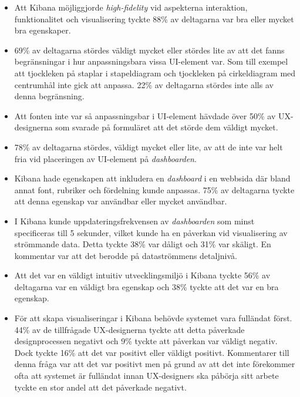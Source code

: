 \documentclass[12pt]{kththesis}
\begin{document}
\begin{itemize}
\item Att Kibana möjliggjorde \textit{high-fidelity} vid aspekterna interaktion, funktionalitet och visualisering tyckte 88\% av deltagarna var bra eller mycket bra egenskaper.

\item 69\% av deltagarna stördes väldigt mycket eller stördes lite av att det fanns begränsningar i hur anpassningsbara vissa UI-element var. Som till exempel att tjockleken på staplar i stapeldiagram och tjockleken på cirkeldiagram med centrumhål inte gick att anpassa. 22\% av deltagarna stördes inte alls av denna begränsning.

\item Att fonten inte var så anpassningsbar i UI-element hävdade över 50\% av UX-designerna som svarade på formuläret att det störde dem väldigt mycket.

\item 78\% av deltagarna stördes, väldigt mycket eller lite, av att de inte var helt fria vid placeringen av UI-element på \textit{dashboarden}. 

\item Kibana hade egenskapen att inkludera en \textit{dashboard} i en webbsida där bland annat font, rubriker och fördelning kunde anpassas. 75\% av deltagarna tyckte att denna egenskap var användbar eller mycket användbar.

\item I Kibana kunde uppdateringsfrekvensen av \textit{dashboarden} som minst specificeras till 5 sekunder, vilket kunde ha en påverkan vid visualisering av strömmande data. Detta tyckte 38\% var dåligt och 31\% var skäligt. En kommentar var att det berodde på dataströmmens detaljnivå.

\item Att det var en väldigt intuitiv utvecklingsmiljö i Kibana tyckte 56\% av deltagarna var en väldigt bra egenskap och 38\% tyckte att det var en bra egenskap.

\item För att skapa visualiseringar i Kibana behövde systemet vara fulländat först. 44\% av de tillfrågade UX-designerna tyckte att detta påverkade designprocessen negativt och 9\% tyckte att påverkan var väldigt negativ. Dock tyckte 16\% att det var positivt eller väldigt positivt. Kommentarer till denna fråga var att det var positivt men på grund av att det inte förekommer ofta att systemet är fulländat innan UX-designers ska påbörja sitt arbete tyckte en stor andel att det påverkade negativt.


\end{itemize}
\end{document}
